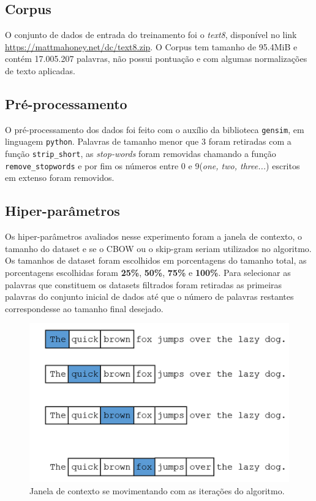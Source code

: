 \documentclass[11pt]{scrartcl} %
\begin{document}
\subsection{Corpus}
O conjunto de dados de entrada do treinamento foi o \textit{text8}, disponível no link\\ \hyperlink{corpus(text8)}{https://mattmahoney.net/dc/text8.zip}. O Corpus tem tamanho de 95.4MiB e contém 17.005.207 palavras, não possui  pontuação e com algumas normalizações de texto aplicadas.

\subsection{Pré-processamento}

O pré-processamento dos dados foi feito com o auxílio da biblioteca \texttt{gensim}, em linguagem \texttt{python}. 
Palavras de tamanho menor que 3 foram retiradas com a função \texttt{strip\_short}, as \textit{stop-words} foram removidas chamando a função \texttt{remove\_stopwords} e por fim os números entre 0 e 9(\textit{one, two, three...}) escritos em extenso foram removidos.

\subsection{Hiper-parâmetros}\label{sec:hiperparams}

Os hiper-parâmetros avaliados nesse experimento foram a janela de contexto, o tamanho do dataset e se o CBOW ou o skip-gram seriam utilizados no algoritmo. Os tamanhos de dataset foram escolhidos em porcentagens do tamanho total, as porcentagens escolhidas foram \textbf{25\%}, \textbf{50\%}, \textbf{75\%} e \textbf{100\%}. Para selecionar as palavras que constituem os datasets filtrados foram retiradas as primeiras palavras do conjunto inicial de dados até que o número de palavras restantes correspondesse ao tamanho final desejado.

\begin{figure}[H] %
	\centering
	\includegraphics[width=0.5\columnwidth]{./Figures/window.png} %
	\caption{Janela de contexto se movimentando com as iterações do algoritmo.}
\end{figure}
\end{document}
